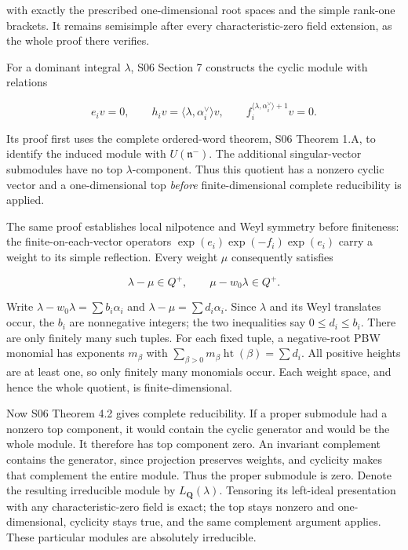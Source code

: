 \documentclass[11pt,a4paper,openany]{report}
\begin{document}
with exactly the prescribed one-dimensional root spaces and the simple rank-one brackets. It remains semisimple after every characteristic-zero field extension, as the whole proof there verifies.

For a dominant integral \(\lambda\), S06 Section 7 constructs the cyclic module with relations

\[
e_i v=0,\qquad
h_i v=\langle\lambda,\alpha_i^\vee\rangle v,\qquad
f_i^{\langle\lambda,\alpha_i^\vee\rangle+1}v=0.
\]

Its proof first uses the complete ordered-word theorem, S06 Theorem 1.A, to identify the induced module with \(U(\mathfrak n^-)\). The additional singular-vector submodules have no top \(\lambda\)-component. Thus this quotient has a nonzero cyclic vector and a one-dimensional top \emph{before} finite-dimensional complete reducibility is applied.

The same proof establishes local nilpotence and Weyl symmetry before finiteness: the finite-on-each-vector operators \(\exp(e_i)\exp(-f_i)\exp(e_i)\) carry a weight to its simple reflection. Every weight \(\mu\) consequently satisfies

\[
\lambda-\mu\in Q^+,\qquad \mu-w_0\lambda\in Q^+.
\]

Write \(\lambda-w_0\lambda=\sum b_i\alpha_i\) and \(\lambda-\mu=\sum d_i\alpha_i\). Since \(\lambda\) and its Weyl translates occur, the \(b_i\) are nonnegative integers; the two inequalities say \(0\le d_i\le b_i\). There are only finitely many such tuples. For each fixed tuple, a negative-root PBW monomial has exponents \(m_\beta\) with \(\sum_{\beta>0}m_\beta\operatorname{ht}(\beta)=\sum d_i\). All positive heights are at least one, so only finitely many monomials occur. Each weight space, and hence the whole quotient, is finite-dimensional.

Now S06 Theorem 4.2 gives complete reducibility. If a proper submodule had a nonzero top component, it would contain the cyclic generator and would be the whole module. It therefore has top component zero. An invariant complement contains the generator, since projection preserves weights, and cyclicity makes that complement the entire module. Thus the proper submodule is zero. Denote the resulting irreducible module by \(L_{\mathbf Q}(\lambda)\). Tensoring its left-ideal presentation with any characteristic-zero field is exact; the top stays nonzero and one-dimensional, cyclicity stays true, and the same complement argument applies. These particular modules are absolutely irreducible.
\end{document}
